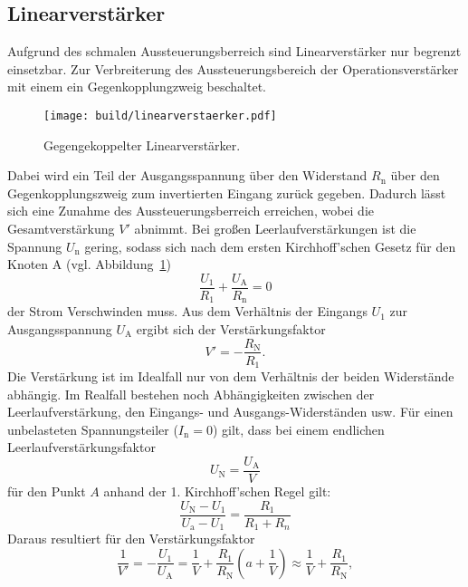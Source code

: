 \subsection{Linearverstärker}%
\label{sub:linearverstaerker}
Aufgrund des schmalen Aussteuerungsberreich sind Linearverstärker nur
begrenzt einsetzbar.
Zur Verbreiterung des Aussteuerungsbereich der Operationsverstärker mit einem
ein Gegenkopplungzweig beschaltet.
\begin{figure}[h]
		\centering
		\texttt{[image: build/linearverstaerker.pdf]}
		\caption{Gegengekoppelter Linearverstärker.\cite{anleitung}}
		\label{fig:lin}
\end{figure}
Dabei wird ein Teil der Ausgangsspannung über den Widerstand $R_\text{n}$ über
den Gegenkopplungszweig zum invertierten Eingang zurück gegeben.
Dadurch lässt sich eine Zunahme des Aussteuerungsberreich erreichen, wobei die
Gesamtverstärkung $V'$ abnimmt.
Bei großen Leerlaufverstärkungen ist die Spannung $U_\text{n}$ gering, sodass
sich nach dem ersten Kirchhoff'schen Gesetz für den Knoten A (vgl. Abbildung~\ref{fig:lin})
\begin{equation}
		\frac{U_1}{R_1} + \frac{U_\text{A}}{R_\text{n}} = 0
\end{equation}
der Strom Verschwinden muss.
Aus dem Verhältnis der Eingangs $U_1$ zur Ausgangsspannung $U_\text{A}$ ergibt
sich der Verstärkungsfaktor
\begin{equation}
		V' = - \frac{R_\text{N}}{R_1}.
\end{equation}
Die Verstärkung ist im Idealfall nur von dem Verhältnis der beiden
Widerstände abhängig.
Im Realfall bestehen noch Abhängigkeiten zwischen der Leerlaufverstärkung,
den Eingangs- und Ausgangs-Widerständen usw.
Für einen unbelasteten Spannungsteiler ($I_\text{n} = 0$) gilt,
dass bei einem endlichen Leerlaufverstärkungsfaktor
\begin{equation}
		U_\text{N} = \frac{U_\text{A}}{V}
\end{equation}
für den Punkt $A$ anhand der 1. Kirchhoff'schen Regel gilt:
\begin{equation}
		\frac{U_\text{N}-U_1}{U_\text{a}-U_1} = \frac{R_1}{R_1 + R_n}
\end{equation}
Daraus resultiert für den Verstärkungsfaktor
\begin{equation}
  \label{eq:v_strich}
		\frac{1}{V'}= - \frac{U_1}{U_\text{A}} = \frac{1}{V} +
		\frac{R_1}{R_\text{N}} \left( a + \frac{1}{V} \right) \approx
		\frac{1}{V} + \frac{R_1}{R_\text{N}},
\end{equation}
